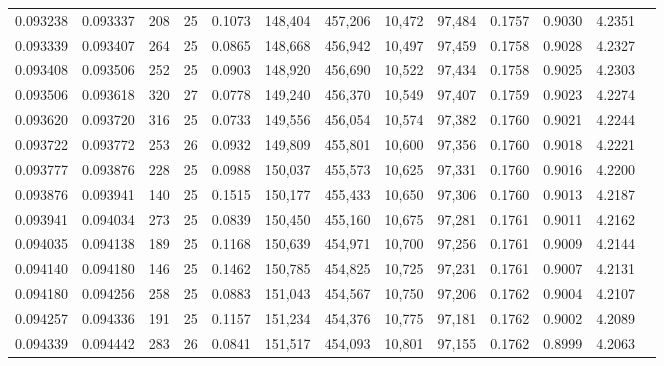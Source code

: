 \begin{tabular}{rrrrrrrrrrrrr}
0.093238 & 0.093337 & 208 &  25 &                                     0.1073 & 148,404 & 457,206 &  10,472 &  97,484 & 0.1757 & 0.9030 & 4.2351 \\
0.093339 & 0.093407 & 264 &  25 &                                     0.0865 & 148,668 & 456,942 &  10,497 &  97,459 & 0.1758 & 0.9028 & 4.2327 \\
0.093408 & 0.093506 & 252 &  25 &                                     0.0903 & 148,920 & 456,690 &  10,522 &  97,434 & 0.1758 & 0.9025 & 4.2303 \\
0.093506 & 0.093618 & 320 &  27 &                                     0.0778 & 149,240 & 456,370 &  10,549 &  97,407 & 0.1759 & 0.9023 & 4.2274 \\
0.093620 & 0.093720 & 316 &  25 &                                     0.0733 & 149,556 & 456,054 &  10,574 &  97,382 & 0.1760 & 0.9021 & 4.2244 \\
0.093722 & 0.093772 & 253 &  26 &                                     0.0932 & 149,809 & 455,801 &  10,600 &  97,356 & 0.1760 & 0.9018 & 4.2221 \\
0.093777 & 0.093876 & 228 &  25 &                                     0.0988 & 150,037 & 455,573 &  10,625 &  97,331 & 0.1760 & 0.9016 & 4.2200 \\
0.093876 & 0.093941 & 140 &  25 &                                     0.1515 & 150,177 & 455,433 &  10,650 &  97,306 & 0.1760 & 0.9013 & 4.2187 \\
0.093941 & 0.094034 & 273 &  25 &                                     0.0839 & 150,450 & 455,160 &  10,675 &  97,281 & 0.1761 & 0.9011 & 4.2162 \\
0.094035 & 0.094138 & 189 &  25 &                                     0.1168 & 150,639 & 454,971 &  10,700 &  97,256 & 0.1761 & 0.9009 & 4.2144 \\
0.094140 & 0.094180 & 146 &  25 &                                     0.1462 & 150,785 & 454,825 &  10,725 &  97,231 & 0.1761 & 0.9007 & 4.2131 \\
0.094180 & 0.094256 & 258 &  25 &                                     0.0883 & 151,043 & 454,567 &  10,750 &  97,206 & 0.1762 & 0.9004 & 4.2107 \\
0.094257 & 0.094336 & 191 &  25 &                                     0.1157 & 151,234 & 454,376 &  10,775 &  97,181 & 0.1762 & 0.9002 & 4.2089 \\
0.094339 & 0.094442 & 283 &  26 &                                     0.0841 & 151,517 & 454,093 &  10,801 &  97,155 & 0.1762 & 0.8999 & 4.2063 \\

\end{tabular}
